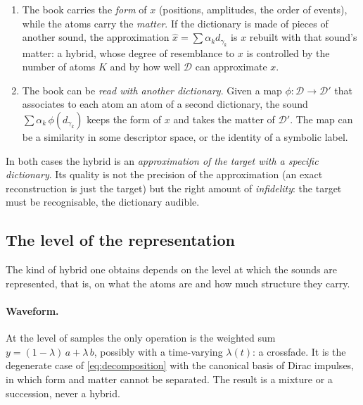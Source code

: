 \documentclass[11pt,a4paper]{article}
\newcommand{\D}{\mathcal{D}}
\begin{document}
\begin{enumerate}[leftmargin=*]
\item The book carries the \emph{form} of $x$ (positions, amplitudes, the
  order of events), while the atoms carry the \emph{matter}. If the
  dictionary is made of pieces of another sound, the approximation
  $\hat x = \sum \alpha_k d_{\gamma_k}$ is $x$ rebuilt with that sound's
  matter: a hybrid, whose degree of resemblance to $x$ is controlled by the
  number of atoms $K$ and by how well $\D$ can approximate $x$.
\item The book can be \emph{read with another dictionary}. Given a map
  $\phi : \D \to \D'$ that associates to each atom an atom of a second
  dictionary, the sound $\sum \alpha_k \, \phi(d_{\gamma_k})$ keeps the form
  of $x$ and takes the matter of $\D'$. The map can be a similarity in some
  descriptor space, or the identity of a symbolic label.
\end{enumerate}

In both cases the hybrid is an \emph{approximation of the target with a
specific dictionary}. Its quality is not the precision of the approximation
(an exact reconstruction is just the target) but the right amount of
\emph{infidelity}: the target must be recognisable, the dictionary audible.

\subsection{The level of the representation}

The kind of hybrid one obtains depends on the level at which the sounds are
represented, that is, on what the atoms are and how much structure they
carry.

\paragraph{Waveform.} At the level of samples the only operation is the
weighted sum $y = (1-\lambda)\, a + \lambda\, b$, possibly with a time-varying
$\lambda(t)$: a crossfade. It is the degenerate case of
\eqref{eq:decomposition} with the canonical basis of Dirac impulses, in which
form and matter cannot be separated. The result is a mixture or a
succession, never a hybrid.
\end{document}
